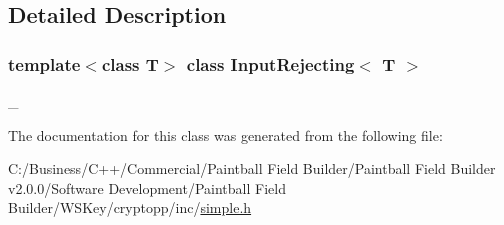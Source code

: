 \subsection{Detailed Description}
\subsubsection*{template$<$class T$>$ class InputRejecting$<$ T $>$}

\_\- 

The documentation for this class was generated from the following file:\begin{DoxyCompactItemize}
\item 
C:/Business/C++/Commercial/Paintball Field Builder/Paintball Field Builder v2.0.0/Software Development/Paintball Field Builder/WSKey/cryptopp/inc/\hyperlink{simple_8h}{simple.h}\end{DoxyCompactItemize}
